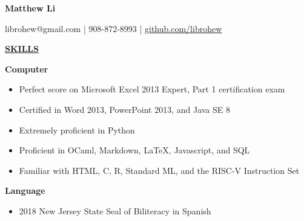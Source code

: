 \documentclass[
]{article}
\author{}
\date{\vspace{-2.5em}}
\providecommand{\tightlist}{%
  \setlength{\itemsep}{0pt}\setlength{\parskip}{0pt}}
\begin{document}

\begin{center}

\textbf{Matthew Li}

\end{center}

\begin{center}
librohew@gmail.com | 908-872-8993 | \href{https://www.github.com/librohew}{github.com/librohew}   
\end{center}

\textbf{\underline{SKILLS}}

\textbf{Computer}

\begin{itemize}
\item
  Perfect score on Microsoft Excel 2013 Expert, Part 1 certification
  exam
\item
  Certified in Word 2013, PowerPoint 2013, and Java SE 8
\end{itemize}

\begin{itemize}
\item
  Extremely proficient in Python
\item
  Proficient in OCaml, Markdown, LaTeX, Javascript, and SQL
\item
  Familiar with HTML, C, R, Standard ML, and the RISC-V
  Instruction Set
\end{itemize}

\textbf{Language}

\begin{itemize}
\item
  2018 New Jersey State Seal of Biliteracy in Spanish
\end{itemize}




\end{document}
